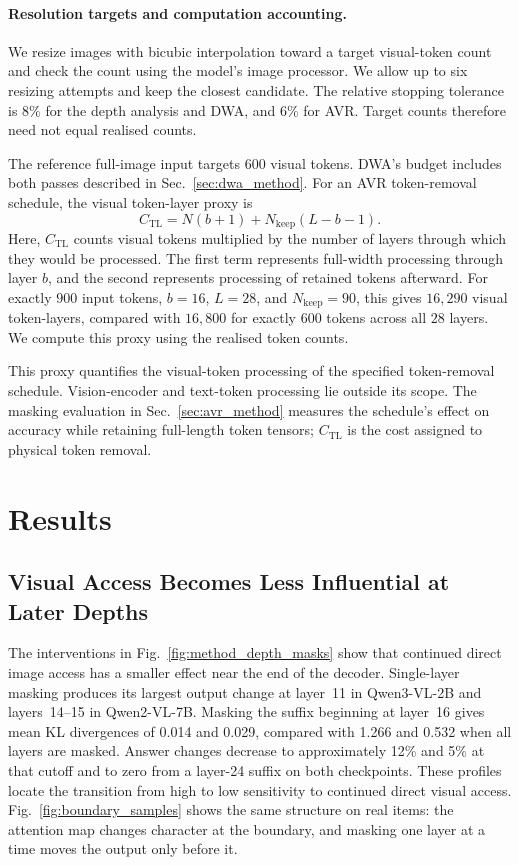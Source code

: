 \documentclass{article} %
\begin{document}
\paragraph{Resolution targets and computation accounting.}
We resize images with bicubic interpolation toward a target visual-token
count and check the count using the model's image processor. We allow up
to six resizing attempts and keep the closest candidate. The relative
stopping tolerance is \(8\%\) for the depth analysis and DWA, and
\(6\%\) for AVR. Target counts therefore need not equal realised counts.

The reference full-image input targets \(600\) visual tokens. DWA's
budget includes both passes described in Sec.~\ref{sec:dwa_method}.
For an AVR token-removal schedule, the visual token-layer proxy is
\begin{equation}
    C_{\mathrm{TL}} = N(b+1)
    +N_{\mathrm{keep}}(L-b-1).
\end{equation}
Here, \(C_{\mathrm{TL}}\) counts visual tokens multiplied by the
number of layers through which they would be processed. The first
term represents full-width processing through layer \(b\), and the
second represents processing of retained tokens afterward.
For exactly \(900\) input tokens, \(b=16\), \(L=28\), and
\(N_{\mathrm{keep}}=90\), this gives \(16{,}290\) visual
token-layers, compared with \(16{,}800\) for exactly \(600\) tokens
across all \(28\) layers. We compute this proxy using the realised
token counts.

This proxy quantifies the visual-token processing of the specified
token-removal schedule. Vision-encoder and text-token processing lie
outside its scope. The masking evaluation in Sec.~\ref{sec:avr_method}
measures the schedule's effect on accuracy while retaining full-length
token tensors; $C_{\mathrm{TL}}$ is the cost assigned to physical
token removal.


\section{Results}
\label{sec:results}

\subsection{Visual Access Becomes Less Influential at Later Depths}
\label{sec:transport_results}

The interventions in Fig.~\ref{fig:method_depth_masks} show that
continued direct image access has a smaller effect near the end of the
decoder. Single-layer masking produces its largest output change at
layer~11 in Qwen3-VL-2B and layers~14--15 in Qwen2-VL-7B. Masking the
suffix beginning at layer~16 gives mean KL divergences of 0.014 and 0.029,
compared with 1.266 and 0.532 when all layers are masked.
Answer changes decrease to approximately 12\% and 5\% at that
cutoff and to zero from a layer-24 suffix on both checkpoints.
These profiles locate the transition from high to low sensitivity
to continued direct visual access. Fig.~\ref{fig:boundary_samples} shows the same structure on real
items: the attention map changes character at the boundary, and masking one layer at a time moves the
output only before it.
\end{document}
